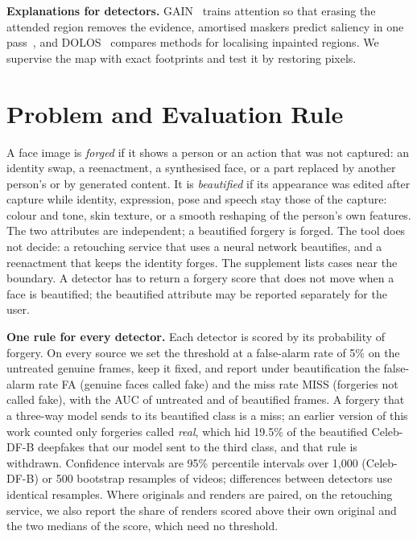\documentclass[conference]{IEEEtran}
\begin{document}
\textbf{Explanations for detectors.} GAIN~\cite{gain} trains attention so that erasing the attended region removes the
evidence, amortised maskers predict saliency in one pass~\cite{dabkowski2017,phang2020}, and DOLOS~\cite{dolos} compares
methods for localising inpainted regions. We supervise the map with exact footprints and test it by restoring pixels.

\section{Problem and Evaluation Rule}
\label{sec:protocol}
A face image is \emph{forged} if it shows a person or an action that was not captured: an identity swap, a reenactment, a
synthesised face, or a part replaced by another person's or by generated content. It is \emph{beautified} if its
appearance was edited after capture while identity, expression, pose and speech stay those of the capture: colour and
tone, skin texture, or a smooth reshaping of the person's own features. The two attributes are independent; a beautified
forgery is forged. The tool does not decide: a retouching service that uses a neural network beautifies, and a reenactment
that keeps the identity forges. The supplement lists cases near the boundary. A detector has to return a forgery
score that does not move when a face is beautified; the beautified attribute may be reported separately for the user.

\textbf{One rule for every detector.} Each detector is scored by its probability of forgery. On every source we set the
threshold at a false-alarm rate of 5\% on the untreated genuine frames, keep it fixed, and report under beautification
the false-alarm rate FA (genuine faces called fake) and the miss rate MISS (forgeries not called fake), with the AUC of
untreated and of beautified frames. A forgery that a three-way model sends to its beautified class is a miss; an earlier
version of this work counted only forgeries called \emph{real}, which hid 19.5\% of the beautified Celeb-DF-B deepfakes
that our model sent to the third class, and that rule is withdrawn. Confidence intervals are 95\% percentile intervals
over 1,000 (Celeb-DF-B) or 500 bootstrap resamples of videos; differences between detectors use identical resamples.
Where originals and renders are paired, on the retouching service, we also report the share of renders scored above
their own original and the two medians of the score, which need no threshold.
\end{document}
